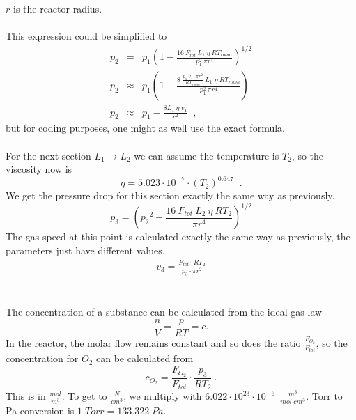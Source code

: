 \documentclass[10pt, a4paper]{article}
\begin{document}
$r$ is the reactor radius. 
\\
\\
This expression could be simplified to 
\begin{eqnarray*}
p_2 &=& p_1\left(  1 - \frac{16\:F_{tot} \: L_1 \: \eta \: R T_{room} }{p_1^2 \: \pi r^4} \right)^{1/2} \\
p_2 &\approx & p_1 \left( 1 - \frac{8\:\frac{p_1\; v_1 \cdot \pi r^2}{R T_{room}  } \: L_1 \; \eta \: RT_{room}}{p_1^2 \: \pi r^4} \right) \\
p_2 &\approx & p_1 - \frac{8L_1 \: \eta \: v_1}{r^2} \;\;,
\end{eqnarray*}
but for coding purposes, one might as well use the exact formula. 
\\
\\
For the next section $L_1 \rightarrow L_2$ we can assume the temperature is $T_2$, so the viscosity now is 
\begin{equation*}
\eta = 5.023\cdot 10^{-7} \cdot \left(T_2 \right)^{0.647}  \;\;. 
\end{equation*}
We get the pressure drop for this section exactly the same way as previously. 
\begin{equation*}
p_3 = \left( {p_2}^2 - \frac{16\:F_{tot} \: L_2 \: \eta \: RT_2}{\pi r^4} \right)^{1/2}
\end{equation*}
The gas speed at this point is calculated exactly the same way as previously, the parameters just have different values. 
\begin{eqnarray*}
v_3 = \frac{F_{tot} \cdot RT_2}{p_3 \cdot \pi r^2}
\end{eqnarray*}
\\
\\
The concentration of a substance can be calculated from the ideal gas law 
\begin{equation*}
\frac{n}{V} = \frac{p}{RT} = c. 
\end{equation*}
In the reactor, the molar flow remains constant and so does the ratio $ \frac{F_{O_2}}{F_{tot}}$, so the concentration for $O_2$ can be calculated from 
\begin{equation*}
c_{O_2} = \frac{F_{O_2}}{F_{tot}} \cdot \frac{p_3}{RT_2} \:. 
\end{equation*}
This is in $ \frac{mol}{m^3}$. To get to $ \frac{N}{cm^3}$, we multiply with $6.022 \cdot 10^{23} \cdot 10^{-6}\:\: \frac{m^3}{mol\;cm^3} $. 
Torr to Pa conversion is $1\;Torr = 133.322\;Pa$. 
\end{document}
